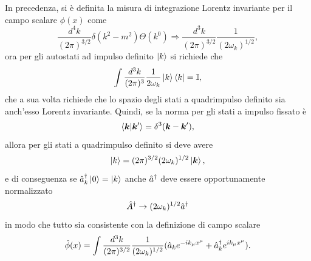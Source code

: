 In precedenza, si è definita la misura di integrazione Lorentz invariante per il campo scalare $\phi(x)$ come
\begin{equation}
    \frac{d^4k}{(2\pi)^{3/2}}\delta(k^2 - m^2)\Theta(k^0) \Rightarrow \frac{d^3k}{(2\pi)^{3/2}}\frac{1}{(2\omega_k)^{1/2}},
\end{equation}
ora per gli autostati ad impulso definito $\ket{k}$ si richiede che 
\begin{equation}
    \int\frac{d^3k}{(2\pi)^3}\frac{1}{2\omega_k}\ket{k}\bra{k} = \mathbb{I},
\end{equation}
che a sua volta richiede che lo spazio degli stati a quadrimpulso definito sia anch'esso Lorentz invariante. Quindi, se la norma per gli stati a impulso fissato è
\begin{equation}
    \langle \bm{k} | \bm{k}' \rangle = \delta^3(\bm{k} - \bm{k}'),
\end{equation}
allora per gli stati a quadrimpulso definito si deve avere
\begin{equation}
    \ket{k} = (2\pi)^{3/2}(2\omega_k)^{1/2}\ket{\bm{k}},
\end{equation}
e di conseguenza se $\hat{a}^\dagger_k\ket{0} = \ket{k}$ anche $\hat{a}^\dagger$ deve essere opportunamente normalizzato
\begin{equation}
    \hat{A}^\dagger\to(2\omega_k)^{1/2}\hat{a}^\dagger
\end{equation}
in modo che tutto sia consistente con la definizione di campo scalare
\begin{equation}
    \hat{\phi}(x) = \int\frac{d^3k}{(2\pi)^{3/2}}\frac{1}{(2\omega_k)^{1/2}}(\hat{a}_ke^{-ik_\mu x^\mu} + \hat{a}^\dagger_k e^{ik_\mu x^\mu}).
\end{equation}

